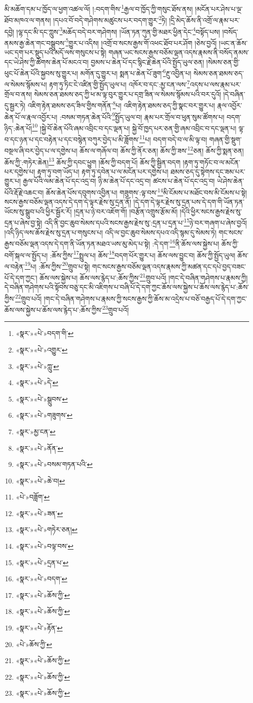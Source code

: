 མི་མཆོག་དམ་པ་ཁྱོད་ལ་ཕྱག་འཚལ་ལོ། །:བདག་གིས་\footnote{«སྣར་»«པེ་»བདག་གི་}རྒྱལ་བ་ཁྱོད་ཀྱི་གསུང་ཐོས་ནས། །མངོན་པར་ཤེས་པ་ལྔ་ཐོབ་མཁའ་ལ་གནས། །དཔའ་བོ་བདེ་གཤེགས་མཚུངས་པར་བདག་གྱུར་\footnote{«སྣར་»«པེ་»འགྱུར་}ཏེ། །དྲི་མེད་ཆོས་ནི་འགྲོ་ལ་རྣམ་པར་དབྱེ། །ལྷ་དང་མི་དང་ཀླུས་\footnote{«སྣར་»«པེ་»ཀླུ་}མཆོད་བདེ་བར་གཤེགས། །ཡོན་ཏན་ཀུན་གྱི་མཐར་ཕྱིན་དེང་\footnote{«སྣར་»«པེ་»དེ་}བསྟོད་པས། །བསོད་ནམས་རྒྱ་ཆེན་གང་བསྒྲུབས་\footnote{«སྣར་»«པེ་»སྒྲུབས་}གྱུར་པ་འདིས། །འགྲོ་བ་སངས་རྒྱས་གོ་འཕང་ཐོབ་པར་ཤོག །ཅེས་བྱའོ། །ཡང་ན་ཆོས་ཡང་དག་པར་སྡུད་པའི་མདོ་ལས་གསུངས་པ་སྟེ། གཞན་ཡང་སངས་རྒྱས་བཅོམ་ལྡན་འདས་རྣམས་ནི་བསོད་ནམས་དང་ཡེ་ཤེས་ཀྱི་ཚོགས་ཆེན་པོ་མངའ་བ། བྱམས་པ་ཆེན་པོ་དང་སྙིང་རྗེ་ཆེན་པོའི་སྤྱོད་ཡུལ་ཅན། །སེམས་ཅན་གྱི་ཕུང་པོ་ཆེན་པོའི་སྐྱབས་སུ་གྱུར་པ། མགོན་དུ་གྱུར་པ། སྨན་པ་ཆེན་པོ་ཟུག་\footnote{«སྣར་»«པེ་»གཟུགས་}རྔུ་འབྱིན་པ། སེམས་ཅན་ཐམས་ཅད་ལ་སེམས་སྙོམས་པ། རྟག་ཏུ་ཏིང་ངེ་འཛིན་གྱི་སྤྱོད་ཡུལ་པ། འཁོར་བ་དང་:མྱ་ངན་ལས་\footnote{«སྣར་»མྱ་ངན་}འདས་པ་ལས་རྣམ་པར་གྲོལ་བ་ནས། སེམས་ཅན་ཐམས་ཅད་ཀྱི་ཕ་མ་ལྟ་བུར་གྱུར་པ་དགྲ་ཟིན་ལ་སེམས་སྙོམས་པའི་བར་དུའོ། །དེ་བཞིན་དུ་སྦྱར་ཏེ། འཇིག་རྟེན་ཐམས་ཅད་ཟིལ་གྱིས་གནོན་\footnote{«སྣར་»«པེ་»ནོན་}པ། འཇིག་རྟེན་ཐམས་ཅད་ཀྱི་སྣང་བར་གྱུར་པ། རྣལ་འབྱོར་ཆེན་པོ་ལ་རྣལ་འབྱོར་པ། :བསམ་གཏན་ཆེན་པོའི་\footnote{«སྣར་»«པེ་»བསམ་གཏན་པའི་}སྤྱོད་ཡུལ་བ། རྣམ་པར་གྲོལ་བ་ཕུན་སུམ་ཚོགས་པ། བདག་ཉིད་:ཆེན་པོ།\footnote{«སྣར་»«པེ་»ཆེ་བ།} །སྐྱེ་བོ་ཆེན་པོའི་ཞམ་འབྲིང་བ་དང་ལྡན་པ། སྐྱེ་བོ་ཁྱད་པར་ཅན་གྱི་ཞམ་འབྲིང་བ་དང་ལྡན་པ། ལྟ་བ་དང་ཉན་པ་དང་བརྟེན་པ་དང་བསྙེན་བཀུར་བྱེད་པ་མི་ཟློགས་\footnote{«པེ་»བཟློག་}པ། བདག་བདེ་བ་ལ་མི་ལྟ་བ། གཞན་གྱི་སྡུག་བསྔལ་ཞི་བར་བྱེད་པ་ལ་དགྱེས་པ། ཆོས་ལ་གཞོལ་བ། ཆོས་ཀྱི་ནོར་ཅན། ཆོས་ཀྱི་ཟས་\footnote{«སྣར་»«པེ་»ཟན་}ཅན། ཆོས་ཀྱི་སྨན་ཅན། ཆོས་ཀྱི་:གཏེར་ཆེན།\footnote{«སྣར་»«པེ་»གཏེར་ཅན།} ཆོས་ཀྱི་དབང་ཕྱུག །ཆོས་ཀྱི་བདག་པོ། ཆོས་ཀྱི་སྦྱིན་བདག །རྟག་ཏུ་གཏོང་བ་ལ་མངོན་པར་དགྱེས་པ། རྟག་ཏུ་བག་ཡོད་པ། རྟག་ཏུ་དབེན་པ་ལ་མངོན་པར་དགྱེས་པ། ཐམས་ཅད་དུ་སྟེགས་དང་ཟམ་པར་གྱུར་པ། རྒྱལ་པོའི་ལམ་ཆེན་པོ་དང་འདྲ་བ། ཉི་མ་ཆེན་པོ་དང་འདྲ་བ། ཚངས་པ་ཆེན་པོ་དང་འདྲ་བ། ཡེ་ཤེས་ཆེན་པོའི་རྡོ་རྗེ་འཆང་བ། ཆོས་ཆེན་པོས་དབུགས་འབྱིན་པ། གཟུགས་:ལྟ་བས་\footnote{«སྣར་»«པེ་»བལྟ་བས་}མི་ངོམས་པ་མཐོང་བས་མི་ངོམས་པ་སྟེ། སངས་རྒྱས་བཅོམ་ལྡན་འདས་དེ་དག་དེ་ལྟར་རྗེས་སུ་དྲན་ནོ། །དེ་དག་དེ་ལྟར་རྗེས་སུ་དྲན་པས་དེ་དག་གི་ཡོན་ཏན་ཡོངས་སུ་སྒྲུབ་པའི་ཕྱིར་སྦྱོར་རོ། །དྲན་པ་ཉེ་བར་འཇོག་གོ། །བརྩོན་འགྲུས་རྩོམ་མོ། །དེའི་ཕྱིར་སངས་རྒྱས་རྗེས་སུ་དྲན་པ་ཞེས་བྱ་སྟེ། འདི་ནི་བྱང་ཆུབ་སེམས་དཔའི་སངས་རྒྱས་རྗེས་སུ་:དྲན་པ་དྲན་པ་\footnote{«སྣར་»«པེ་»དྲན་པ་}ཉེ་བར་གཞག་པ་ཞེས་བྱའོ། །འདི་ཉིད་ལས་ཆོས་རྗེས་སུ་དྲན་པ་གསུངས་པ། འདི་ལ་བྱང་ཆུབ་སེམས་དཔའ་འདི་སྙམ་དུ་སེམས་ཏེ། གང་སངས་རྒྱས་བཅོམ་ལྡན་འདས་དེ་དག་ནི་ཡོན་ཏན་མཐའ་ཡས་མུ་མེད་པ་སྟེ། :དེ་དག་\footnote{«སྣར་»«པེ་»བདག་}ནི་ཆོས་ལས་སྐྱེས་པ། ཆོས་ཀྱི་བགོ་སྐལ་ལ་སྤྱོད་པ། :ཆོས་ཀྱིས་\footnote{«སྣར་»«པེ་»ཆོས་ཀྱི་}སྤྲུལ་པ། ཆོས་\footnote{«སྣར་»«པེ་»ཆོས་ཀྱི་}བདག་པོར་གྱུར་པ། ཆོས་ལས་བྱུང་བ། ཆོས་ཀྱི་སྤྱོད་ཡུལ། ཆོས་ལ་བརྟེན་\footnote{«སྣར་»«པེ་»རྟོན་}པ། :ཆོས་ཀྱིས་\footnote{«པེ་»ཆོས་ཀྱི་}གྲུབ་པ་སྟེ། གང་སངས་རྒྱས་བཅོམ་ལྡན་འདས་རྣམས་ཀྱི་མཚན་དང་དཔེ་བྱད་བཟང་པོ་དེ་དག་ཀྱང་། ཆོས་ལས་སྐྱེས་པ། ཆོས་ལས་རྙེད་པ་:ཆོས་ཀྱིས་\footnote{«སྣར་»«པེ་»ཆོས་ཀྱི་}གྲུབ་པའོ། །གང་དེ་བཞིན་གཤེགས་པ་རྣམས་ཀྱི། དེ་བཞིན་གཤེགས་པའི་སྟོབས་བཅུ་དང་མི་འཇིགས་པ་བཞི་པོ་དེ་དག་ཀྱང་ཆོས་ལས་སྐྱེས་པ་ཆོས་ལས་རྙེད་པ་:ཆོས་ཀྱིས་\footnote{«སྣར་»«པེ་»ཆོས་ཀྱི་}གྲུབ་པའོ། །གང་དེ་བཞིན་གཤེགས་པ་རྣམས་ཀྱི་སངས་རྒྱས་ཀྱི་ཆོས་མ་འདྲེས་པ་བཅོ་བརྒྱད་པོ་དེ་དག་ཀྱང་ཆོས་ལས་སྐྱེས་པ་ཆོས་ལས་རྙེད་པ་:ཆོས་ཀྱིས་\footnote{«སྣར་»«པེ་»ཆོས་ཀྱི་}གྲུབ་པའོ། 
